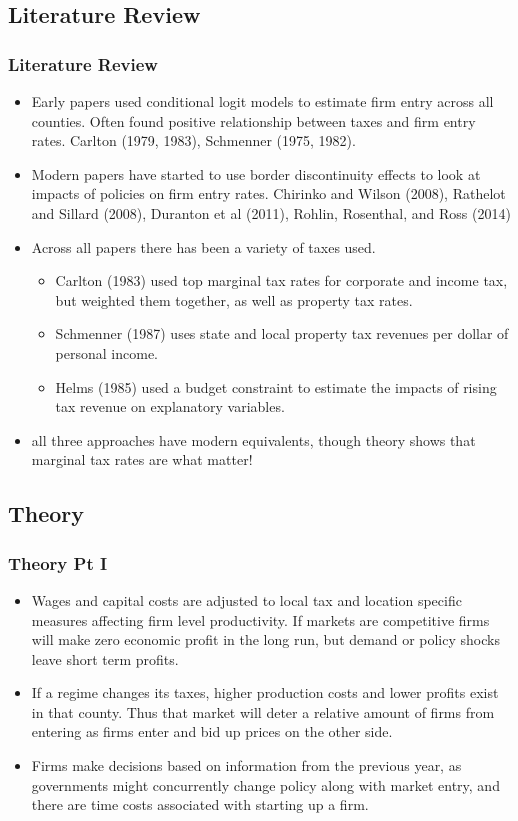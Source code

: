 \documentclass{beamer}
\begin{document}
\begin{frame}
\section{Literature Review}
\frametitle{Literature Review}
\begin{itemize}
\item Early papers used conditional logit models to estimate firm entry across all counties. Often found positive relationship between taxes and firm entry rates. Carlton (1979, 1983), Schmenner (1975, 1982).
\item Modern papers have started to use border discontinuity effects to look at impacts of policies on firm entry rates. Chirinko and Wilson (2008), Rathelot and Sillard (2008), Duranton et al (2011), Rohlin, Rosenthal, and Ross (2014)
\item Across all papers there has been a variety of taxes used. 
\begin{itemize}
\item  Carlton (1983) used top marginal tax rates for corporate and income tax, but weighted them together, as well as property tax rates. 
\item Schmenner (1987) uses state and local property tax revenues per dollar of personal income. 
\item Helms (1985) used a budget constraint to estimate the impacts of rising tax revenue on explanatory variables.
\end{itemize}
\item all three approaches have modern equivalents, though theory shows that marginal tax rates are what matter!
\end{itemize}
\end{frame}

\begin{frame}
\section{Theory}
\frametitle{Theory Pt I}
\begin{itemize}
\item  Wages and capital costs are adjusted to local tax and location specific measures affecting firm level productivity. If markets are competitive firms will make zero economic profit in the long run, but demand or policy shocks leave short term profits.
\item If a regime changes its taxes, higher production costs and lower profits exist in that county. Thus that market will deter a relative amount of firms from entering as firms enter and bid up prices on the other side.
\item Firms make decisions based on information from the previous year, as governments might concurrently change policy along with market entry, and there are time costs associated with starting up a firm.
\end{itemize}
\end{frame}
\end{document}
